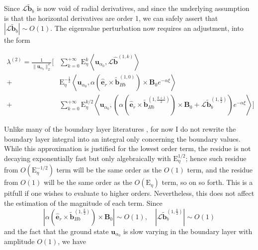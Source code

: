 %
Since $\mathcal{L} \widetilde{\mathbf{b}}_b$ is now void of radial derivatives, and since the underlying assumption is that the horizontal derivatives are order 1, we can safely assert that $|\mathcal{L}\widetilde{\mathbf{b}}_b| \sim O(1)$. The eigenvalue perturbation now requires an adjustment, into the form
%
\begin{mdframed}[style=HighlightBox, frametitle={$\mathrm{Le}^2$ perturbations to the eigenvalue}]
\begin{equation}
\begin{aligned}
    \lambda^{(2)} = \frac{1}{\|\mathbf{u}_{\alpha_0}\|_2^2} \Bigg[&\sum_{k=0}^{+\infty} \mathrm{E}_\eta^k \left\langle \mathbf{u}_{\alpha_0}, \mathcal{L}\widehat{\mathbf{b}}^{(1,k)} \right\rangle \\
    + &\mathrm{E}_\eta^{-\frac{1}{2}} \left\langle \mathbf{u}_{\alpha_0}, \alpha(\hat{\mathbf{e}}_r \times \widetilde{\mathbf{b}}_{Hb}^{(1,0)}) \times \mathbf{B}_0 e^{-\alpha \xi} \right\rangle \\
    + &\sum_{k=0}^{+\infty} \mathrm{E}_\eta^{k/2} \left\langle \mathbf{u}_{\alpha_0}, \left(\alpha(\hat{\mathbf{e}}_r \times \widetilde{\mathbf{b}}_{Hb}^{(1,\frac{k+1}{2})}) \times \mathbf{B}_0 + \mathcal{L}\widetilde{\mathbf{b}}_b^{(1,\frac{k}{2})}\right) e^{-\alpha \xi} \right\rangle \bigg]
\end{aligned}
\end{equation}
\end{mdframed}
%
Unlike many of the boundary layer literatures \citep[e.g.][among others]{kerswell_tidal_1994}, for now I do not rewrite the boundary layer integral into an integral only concerning the boundary values. While this approximation is justified for the lowest order term, the residue is not decaying exponentially fast but only algebraically with $\mathrm{E}_\eta^{1/2}$; hence such residue from $O(\mathrm{E}_\eta^{-1/2})$ term will be the same order as the $O(1)$ term, and the residue from $O(1)$ will be the same order as the $O(\mathrm{E}_\eta)$ term, so on so forth. This is a pitfull if one wishes to evaluate to higher orders. Nevertheless, this does not affect the estimation of the magnitude of each term. Since
%
\[
    \left|\alpha(\hat{\mathbf{e}}_r \times \widetilde{\mathbf{b}}_{Hb}^{(1,\frac{k}{2})}) \times \mathbf{B}_0 \right| \sim O(1),\quad \left|\mathcal{L}\widetilde{\mathbf{b}}_b^{(1,\frac{k}{2})}\right| \sim O(1)
\]
%
and the fact that the ground state $\mathbf{u}_{\alpha_0}$ is slow varying in the boundary layer with amplitude $O(1)$, we have
%
